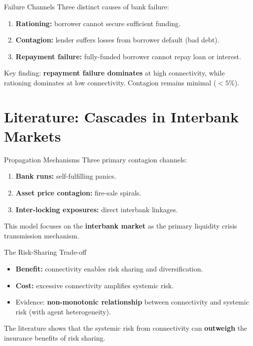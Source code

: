 \begin{frame}{Failure Channels}
  Three distinct causes of bank failure:
  \begin{enumerate}
    \item \textbf{Rationing:} borrower cannot secure sufficient funding.
    \item \textbf{Contagion:} lender suffers losses from borrower default (bad debt).
    \item \textbf{Repayment failure:} fully-funded borrower cannot repay loan or interest.
  \end{enumerate}
  \vspace{0.3cm}
  Key finding: \textbf{repayment failure dominates} at high connectivity, while rationing dominates at low connectivity. Contagion remains minimal ($<5\%$).
\end{frame}

\section{Literature: Cascades in Interbank Markets}\label{sec:6}

\begin{frame}{Propagation Mechanisms}
  Three primary contagion channels:
  \begin{enumerate}
    \item \textbf{Bank runs:} self-fulfilling panics.
    \item \textbf{Asset price contagion:} fire-sale spirals.
    \item \textbf{Inter-locking exposures:} direct interbank linkages.
  \end{enumerate}
  This model focuses on the \textbf{interbank market} as the primary liquidity crisis transmission mechanism.
\end{frame}

\begin{frame}{The Risk-Sharing Trade-off}
  \begin{itemize}
    \item \textbf{Benefit:} connectivity enables risk sharing and diversification.
    \item \textbf{Cost:} excessive connectivity amplifies systemic risk.
    \item Evidence: \textbf{non-monotonic relationship} between connectivity and systemic risk (with agent heterogeneity).
  \end{itemize}
  \vspace{0.3cm}
  The literature shows that the systemic risk from connectivity can \textbf{outweigh} the insurance benefits of risk sharing.
\end{frame}


